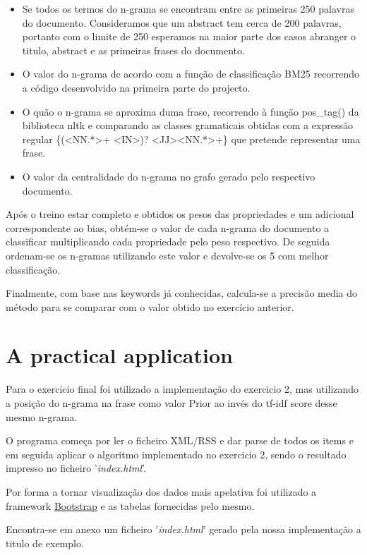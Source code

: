 \documentclass[a4paper,titlepage,11pt]{article}
\begin{document}
\begin{itemize}
  \item Se todos os termos do n-grama se encontram entre as primeiras 250 palavras do documento.
  Consideramos que um abstract tem cerca de 200 palavras, portanto com o limite de 250 esperamos na
  maior parte dos casos abranger o titulo, abstract e as primeiras frases do documento.
  \item O valor do n-grama de acordo com a função de classificação BM25 recorrendo a código desenvolvido
  na primeira parte do projecto.
  \item O quão o n-grama se aproxima duma frase, recorrendo à função pos\_tag() da biblioteca nltk e comparando
  as classes gramaticais obtidas com a expressão regular
  \{(\textless{NN}.*\textgreater+ \textless{IN}\textgreater)? \textless{JJ}\textgreater* \textless{NN}.*\textgreater+\}
  que pretende representar uma frase.
  \item O valor da centralidade do n-grama no grafo gerado pelo respectivo documento.
\end{itemize}

Após o treino estar completo e obtidos os pesos das propriedades e um adicional correspondente ao bias,
obtém-se o valor de cada n-grama do documento a classificar multiplicando cada propriedade pelo peso
respectivo. De seguida ordenam-se os n-gramas utilizando este valor e devolve-se os 5 com melhor classificação.

Finalmente, com base nas keywords já conhecidas, calcula-se a precisão media do método para se comparar
com o valor obtido no exercício anterior.

\section{A practical application}
Para o exercicio final foi utilizado a implementação do exercicio 2, mas utilizando a posição do n-grama na frase
como valor Prior ao invés do tf-idf score desse mesmo n-grama.

O programa começa por ler o ficheiro XML/RSS e dar parse de todos os items e em seguida aplicar o algoritmo implementado
no exercicio 2, sendo o resultado impresso no ficheiro '\textit{index.html}'.

Por forma a tornar visualização dos dados mais apelativa foi utilizado a framework \href{http://getbootstrap.com/}{Bootstrap}
e as tabelas fornecidas pelo mesmo.

Encontra-se em anexo um ficheiro '\textit{index.html}' gerado pela nossa implementação a titulo de exemplo.
\end{document}
